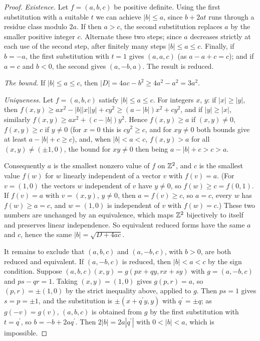 \begin{proof}
\emph{Existence.} Let $f = (a, b, c)$ be positive definite. Using the first substitution with a suitable $t$ we can achieve $|b| \leq a$, since $b + 2at$ runs through a residue class modulo $2a$. If
then $a > c$, the second substitution replaces $a$ by the smaller positive integer $c$. Alternate these two steps; since $a$ decreases strictly at each use of the second step, after finitely many steps
$|b| \leq a \leq c$. Finally, if $b = -a$, the first substitution with $t = 1$ gives $(a, a, c)$ (as $a - a + c = c$); and if $a = c$ and $b < 0$, the second gives $(a, -b, a)$. The result is reduced.

\emph{The bound.} If $|b| \leq a \leq c$, then $|D| = 4ac - b^2 \geq 4a^2 - a^2 = 3a^2$.

\emph{Uniqueness.} Let $f = (a, b, c)$ satisfy $|b| \leq a \leq c$. For integers $x$, $y$: if $|x| \geq |y|$, then
$f(x, y) \geq ax^2 - |b||x||y| + cy^2 \geq (a - |b|)x^2 + cy^2$, and if $|y| \geq |x|$, similarly $f(x, y) \geq ax^2 + (c - |b|)y^2$. Hence $f(x, y) \geq a$ if $(x, y) \neq 0$, $f(x, y) \geq c$ if $y \neq 0$
(for $x = 0$ this is $cy^2 \geq c$, and for $xy \neq 0$ both bounds give at least $a - |b| + c \geq c$), and, when $|b| < a < c$, $f(x, y) > a$ for all $(x, y) \neq (\pm1, 0)$, the bound for $xy \neq 0$ then
being $a - |b| + c > c > a$.

Consequently $a$ is the smallest nonzero value of $f$ on $\mathbb{Z}^2$, and $c$ is the smallest value $f(w)$ for $w$ linearly independent of a vector $v$ with $f(v) = a$. (For $v = (1, 0)$ the vectors $w$ independent
of $v$ have $y \neq 0$, so $f(w) \geq c = f(0, 1)$. If $f(v) = a$ with $v = (x, y)$, $y \neq 0$, then $a = f(v) \geq c$, so $a = c$, every $w$ has $f(w) \geq a = c$, and $w = (1, 0)$ is independent of $v$ with $f(w) = c$.) These two numbers are unchanged by an
equivalence, which maps $\mathbb{Z}^2$ bijectively to itself and preserves linear independence. So equivalent reduced forms have the same $a$ and $c$, hence the same $|b| = \sqrt{D + 4ac}$.

It remains to exclude that $(a, b, c)$ and $(a, -b, c)$, with $b > 0$, are both reduced and equivalent. If $(a, -b, c)$ is reduced, then $|b| < a < c$ by the sign condition. Suppose
$(a, b, c)(x, y) = g(px + qy, rx + sy)$ with $g = (a, -b, c)$ and $ps - qr = 1$. Taking $(x, y) = (1, 0)$ gives $g(p, r) = a$, so $(p, r) = \pm(1, 0)$ by the strict inequality above, applied to $g$. Then
$ps = 1$ gives $s = p = \pm1$, and the substitution is $\pm(x + q^{\prime}y, y)$ with $q^{\prime} = \pm q$; as $g(-v) = g(v)$, $(a, b, c)$ is obtained from $g$ by the first substitution with $t = q^{\prime}$, so
$b = -b + 2aq^{\prime}$. Then $2|b| = 2a|q^{\prime}|$ with $0 < |b| < a$, which is impossible.
\end{proof}

